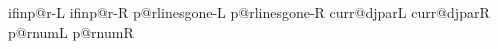 \def\SSsetLRspecific{\ifx\ds@ffix\empty\def\sfx{\@orig}\else\edef\sfx{\ds@ffix}\fi
  \let\wh@t\sp@cificSideDef\pr@cessSpecific}%

\def\showLRspecific{\edef\sfx{\ifdiglot \c@rrdstat\else \@rig\fi}%
  \let\wh@t\sh@wSpecificDef\pr@cessSpecificDef
  \let\wh@t\sh@wSpecificDim\pr@cessSpecificDim
  \let\wh@t\sh@wSpecificDim\pr@cessSpecificCount %
}%
\def\saveLRspecificSide#1{\edef\sfx{#1}%
  \ifx\sfx\empty\let\sfx\@rig\fi
  \trace{S}{Redefining #1-specific values to current settings}%
  \let\wh@t\s@veSpecificSideDef\pr@cessSpecificDef
  \ifx\sfx\l@stLRspecific\else %
    \let\wh@t\s@veSpecificSideDim\pr@cessSpecificDim
  \fi
}
%
%
\def\saveLRspecificOrig{%
  \trace{d}{saveLRspecificOrig \c@rrdstat}%
  \let\wh@t\s@veSpecificOrig\pr@cessSpecificAll\let\saveLRspecificOrig=\relax}

\def\restoreLRorig{%
  \trace{d}{restoreLRorig}%
  \let\wh@t\restoreLR@rig\pr@cessSpecificDim
  \let\wh@t\restoreLR@rig\pr@cessSpecificCount
}
  

\newdimen\FontSizeUnitL\FontSizeUnitL=-1sp\newdimen\FontSizeUnitR\FontSizeUnitR=-1sp
\newdimen\le@dingunitL\le@dingunitL=-1sp\newdimen\le@dingunitR\le@dingunitR=-1sp
\newdimen\onel@neunitL\onel@neunitL=-1sp\newdimen\onel@neunitR\onel@neunitR=-1sp
\newdimen\verticalsp@ceunitL\verticalsp@ceunitL=-1sp\newdimen\verticalsp@ceunitR\verticalsp@ceunitR=-1sp
\newdimen\IndentUnitL\IndentUnitL=-1sp\newdimen\IndentUnitR\IndentUnitR=-1sp
\def\SpaceStretchFactorL{}\def\SpaceStretchFactorR{}
\def\SpaceShrinkFactorL{}\def\SpaceShrinkFactorR{}
\newif\ifRTLL \newif\ifRTLR
\x@\newif\csname ifinp@r-L\endcsname %
\x@\newif\csname ifinp@r-R\endcsname %
\x@\newcount\csname p@rlinesgone-L\endcsname %
\x@\newcount\csname p@rlinesgone-R\endcsname %
\x@\newcount\csname curr@djparL\endcsname %
\x@\newcount\csname curr@djparR\endcsname %
\x@\newcount\csname p@rnumL\endcsname %
\x@\newcount\csname p@rnumR\endcsname %
\newcount\@numcutsL %
\newcount\@numcutsR %
\newcount\dropped@ther@linesL %
\newcount\dropped@ther@linesR %

